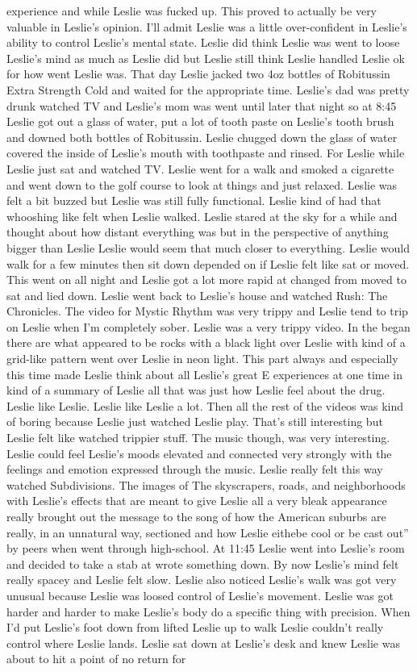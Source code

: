 \documentclass[12pt]{book}
\begin{document}
experience and while Leslie was fucked up. This proved to actually be very valuable in Leslie's opinion. I'll admit Leslie was a little over-confident in Leslie's ability to control Leslie's mental state. Leslie did think Leslie was went to loose Leslie's mind as much as Leslie did but Leslie still think Leslie handled Leslie ok for how went Leslie was. That day Leslie jacked two 4oz bottles of Robitussin Extra Strength Cold and waited for the appropriate time. Leslie's dad was pretty drunk watched TV and Leslie's mom was went until later that night so at 8:45 Leslie got out a glass of water, put a lot of tooth paste on Leslie's tooth brush and downed both bottles of Robitussin. Leslie chugged down the glass of water covered the inside of Leslie's mouth with toothpaste and rinsed. For Leslie while Leslie just sat and watched TV. Leslie went for a walk and smoked a cigarette and went down to the golf course to look at things and just relaxed. Leslie was felt a bit buzzed but Leslie was still fully functional. Leslie kind of had that whooshing like felt when Leslie walked. Leslie stared at the sky for a while and thought about how distant everything was but in the perspective of anything bigger than Leslie Leslie would seem that much closer to everything. Leslie would walk for a few minutes then sit down depended on if Leslie felt like sat or moved. This went on all night and Leslie got a lot more rapid at changed from moved to sat and lied down. Leslie went back to Leslie's house and watched Rush: The Chronicles. The video for Mystic Rhythm was very trippy and Leslie tend to trip on Leslie when I'm completely sober. Leslie was a very trippy video. In the began there are what appeared to be rocks with a black light over Leslie with kind of a grid-like pattern went over Leslie in neon light. This part always and especially this time made Leslie think about all Leslie's great E experiences at one time in kind of a summary of Leslie all that was just how Leslie feel about the drug. Leslie like Leslie. Leslie like Leslie a lot. Then all the rest of the videos was kind of boring because Leslie just watched Leslie play. That's still interesting but Leslie felt like watched trippier stuff. The music though, was very interesting. Leslie could feel Leslie's moods elevated and connected very strongly with the feelings and emotion expressed through the music. Leslie really felt this way watched Subdivisions. The images of The skyscrapers, roads, and neighborhoods with Leslie's effects that are meant to give Leslie all a very bleak appearance really brought out the message to the song of how the American suburbs are really, in an unnatural way, sectioned and how Leslie eithebe cool or be cast out'' by peers when went through high-school. At 11:45 Leslie went into Leslie's room and decided to take a stab at wrote something down. By now Leslie's mind felt really spacey and Leslie felt slow. Leslie also noticed Leslie's walk was got very unusual because Leslie was loosed control of Leslie's movement. Leslie was got harder and harder to make Leslie's body do a specific thing with precision. When I'd put Leslie's foot down from lifted Leslie up to walk Leslie couldn't really control where Leslie lands. Leslie sat down at Leslie's desk and knew Leslie was about to hit a point of no return for 
\end{document}
